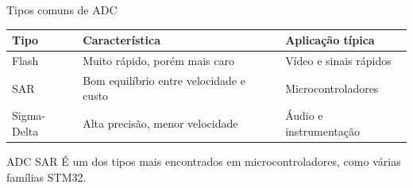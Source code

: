 \begin{frame}{Tipos comuns de ADC}
    \begin{table}
        \centering
        \begin{tabularx}{\textwidth}{l>{\raggedright\arraybackslash}X>{\raggedright\arraybackslash}X}
            \toprule
            Tipo & Característica & Aplicação típica \\
            \midrule
            Flash & Muito rápido, porém mais caro & Vídeo e sinais rápidos \\
            SAR & Bom equilíbrio entre velocidade e custo & Microcontroladores \\
            Sigma-Delta & Alta precisão, menor velocidade & Áudio e instrumentação \\
            \bottomrule
        \end{tabularx}
    \end{table}

    \begin{alertblock}{ADC SAR}
        É um dos tipos mais encontrados em microcontroladores, como várias
        famílias STM32.
    \end{alertblock}
\end{frame}